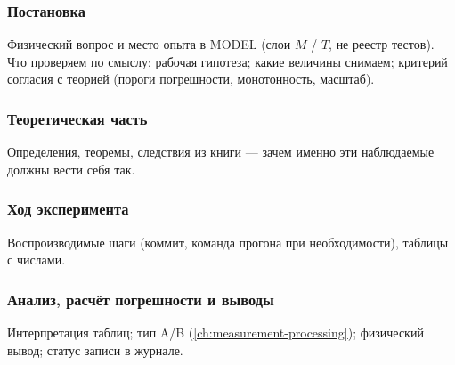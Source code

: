 \subsubsection*{Постановка}
Физический вопрос и место опыта в MODEL (слои $M$ / $T$, не реестр тестов).
Что проверяем по смыслу; рабочая гипотеза; какие величины снимаем; критерий согласия с теорией (пороги погрешности, монотонность, масштаб).

\subsubsection*{Теоретическая часть}
Определения, теоремы, следствия из книги --- зачем именно эти наблюдаемые должны вести себя так.

\subsubsection*{Ход эксперимента}
Воспроизводимые шаги (коммит, команда прогона при необходимости), таблицы с числами.

\subsubsection*{Анализ, расчёт погрешности и выводы}
Интерпретация таблиц; тип A/B (\cref{ch:measurement-processing}); физический вывод; статус записи в журнале.

